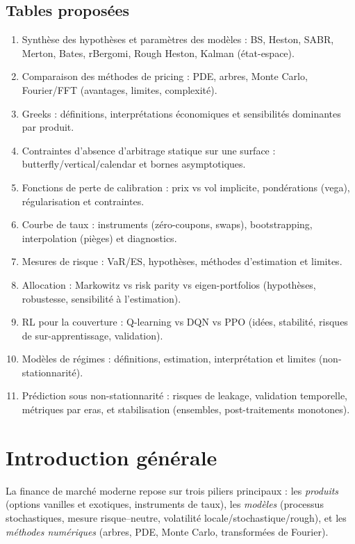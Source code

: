\documentclass[11pt,a4paper]{article}
\newcommand{\1}{\mathbf{1}}
\begin{document}
\subsection*{Tables propos\'ees}
\begin{enumerate}[leftmargin=*,label=T\arabic*.]
  \item Synth\`ese des hypoth\`eses et param\`etres des mod\`eles : BS, Heston, SABR, Merton, Bates, rBergomi, Rough Heston, Kalman (\'etat-espace).
  \item Comparaison des m\'ethodes de pricing : PDE, arbres, Monte Carlo, Fourier/FFT (avantages, limites, complexit\'e).
  \item Greeks : d\'efinitions, interpr\'etations \'economiques et sensibilit\'es dominantes par produit.
  \item Contraintes d'absence d'arbitrage statique sur une surface : butterfly/vertical/calendar et bornes asymptotiques.
  \item Fonctions de perte de calibration : prix vs vol implicite, pond\'erations (vega), r\'egularisation et contraintes.
  \item Courbe de taux : instruments (z\'ero-coupons, swaps), bootstrapping, interpolation (pi\`eges) et diagnostics.
  \item Mesures de risque : VaR/ES, hypoth\`eses, m\'ethodes d'estimation et limites.
  \item Allocation : Markowitz vs risk parity vs eigen-portfolios (hypoth\`eses, robustesse, sensibilit\'e \`a l'estimation).
  \item RL pour la couverture : Q-learning vs DQN vs PPO (id\'ees, stabilit\'e, risques de sur-apprentissage, validation).
  \item Mod\`eles de r\'egimes : d\'efinitions, estimation, interpr\'etation et limites (non-stationnarit\'e).
  \item Pr\'ediction sous non-stationnarit\'e : risques de leakage, validation temporelle, m\'etriques par eras, et stabilisation (ensembles, post-traitements monotones).
\end{enumerate}
\newpage

\section*{Introduction g\'en\'erale}

La finance de march\'e moderne repose sur trois piliers principaux : les \emph{produits}
(options vanilles et exotiques, instruments de taux), les \emph{mod\`eles} (processus stochastiques,
mesure risque--neutre, volatilit\'e locale/stochastique/rough), et les \emph{m\'ethodes num\'eriques}
(arbres, PDE, Monte Carlo, transform\'ees de Fourier).
\end{document}
